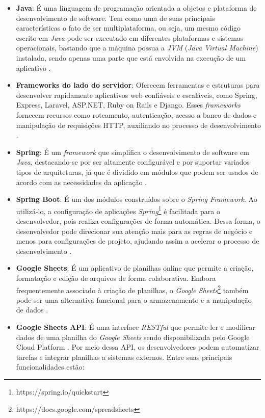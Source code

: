 \begin{itemize}
    \item \textbf{Java}: É uma linguagem de programação orientada a objetos e plataforma de desenvolvimento de software. Tem como uma de suas principais características o fato de ser multiplataforma, ou seja, um mesmo código escrito em \textit{Java} pode ser executado em diferentes plataformas e sistemas operacionais, bastando que a máquina possua a \textit{JVM} (\textit{Java Virtual Machine}) instalada, sendo apenas uma parte que está envolvida na execução de um aplicativo \cite{Java2025}.
    \item \textbf{Frameworks do lado do servidor}: Oferecem ferramentas e estruturas para desenvolver rapidamente aplicativos web confiáveis e escaláveis, como Spring, Express, Laravel, ASP.NET, Ruby on Rails e Django. Esses \textit{frameworks} fornecem recursos como roteamento, autenticação, acesso a banco de dados e manipulação de requisições HTTP, auxiliando no processo de desenvolvimento \cite{santiago2020desenvolvimento}.
    \item \textbf{Spring}: É um \textit{framework} que simplifica o desenvolvimento de software em \textit{Java}, destacando-se por ser altamente configurável e por suportar variados tipos de arquiteturas, já que é dividido em módulos que podem ser usados de acordo com as necessidades da aplicação \cite{Spring2025}.
    \item \textbf{Spring Boot}: É um dos módulos construídos sobre o \textit{Spring Framework}. Ao utilizá-lo, a configuração de aplicações \textit{Spring}\footnote{https://spring.io/quickstart} é facilitada para o desenvolvedor, pois realiza configurações de forma automática. Dessa forma, o desenvolvedor pode direcionar sua atenção mais para as regras de negócio e menos para configurações de projeto, ajudando assim a acelerar o processo de desenvolvimento \cite{SpringBoot2025}.
    \item \textbf{Google Sheets}: É um aplicativo de planilhas online que permite a criação, formatação e edição de arquivos de forma colaborativa. Embora frequentemente associado à criação de planilhas, o \textit{Google Sheets}\footnote{https://docs.google.com/spreadsheets} também pode ser uma alternativa funcional para o armazenamento e a manipulação de dados \cite{ufsm2024}.
    \item \textbf{Google Sheets API}: É uma interface \textit{RESTful} que permite ler e modificar dados de uma planilha do \textit{Google Sheets} sendo disponibilizada pelo Google Cloud Platform \cite{apisheets2025}. Por meio dessa API, os desenvolvedores podem automatizar tarefas e integrar planilhas a sistemas externos. Entre suas principais funcionalidades estão:


\end{itemize}
